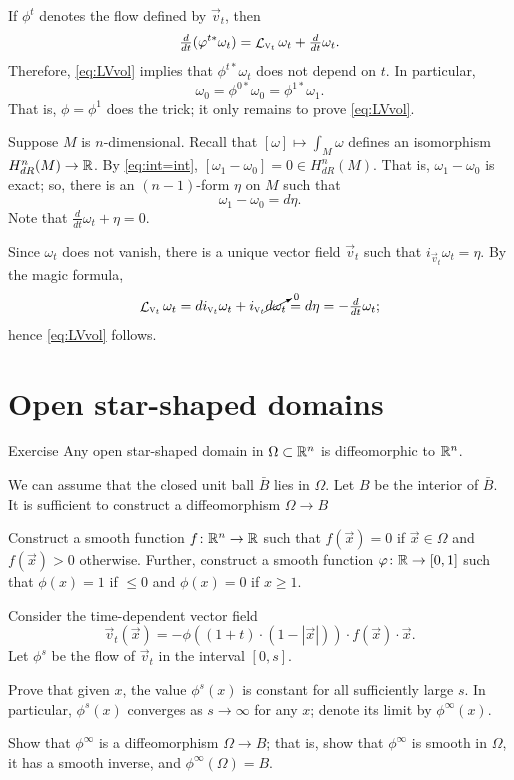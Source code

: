 If $\phi^t$ denotes the flow defined by $\vec v_t$, then
\[\tfrac d{dt}(\varphi^{t*}\omega_t)=\mathop{\mathcal{L}}\nolimits_{\text{\rm \textsc{v}}_t}\omega_t+\tfrac d{dt}\omega_t.\]
Therefore, \ref{eq:LVvol} implies that $\phi^{t*}\omega_t$ does not depend on $t$.
In particular,
\[\omega_0=\phi^{0*}\omega_0=\phi^{1*}\omega_1.\]
That is, $\phi=\phi^1$ does the trick; it only remains to prove \ref{eq:LVvol}.

Suppose $M$ is $n$-dimensional.
Recall that $[\omega]\mapsto\int_M\omega$ defines an isomorphism $H^n_{dR}(M)\to\mathbb{R}$.
By \ref{eq:int=int}, $[\omega_1-\omega_0]=0\in H^n_{dR}(M)$.
That is, $\omega_1-\omega_0$ is exact; so, there is an $(n-1)$-form $\eta$ on $M$ such that
\[\omega_1-\omega_0=d\eta.\]
Note that $\tfrac{d}{d t} \omega_t+\eta=0$.

Since $\omega_t$ does not vanish, there is a unique vector field $\vec{v}_t$ such that
$i_{\vec v_t}\omega_t=\eta$.
By the magic formula,
\[\mathop{\mathcal{L}}\nolimits_{\text{\rm \textsc{v}}_t}\omega_t=di_{\text{\rm \textsc{v}}_t}\omega_t+i_{\text{\rm \textsc{v}}_t}\cancelto{{}_0}{d\omega_t}=d\eta=-\tfrac{d}{d t} \omega_t;\]
hence \ref{eq:LVvol} follows.
\qeds

\section{Open star-shaped domains}

\begin{thm}{Exercise}
Any open star-shaped domain in $\Omega\subset\mathbb{R}^n$ is diffeomorphic to $\mathbb{R}^n$.
\end{thm}

We can assume that the closed unit ball $\bar B$ lies in $\Omega$.
Let $B$ be the interior of $\bar B$.
It is sufficient to construct a diffeomorphism $\Omega\to B$

Construct a smooth function $f\colon\mathbb{R}^n\to \mathbb{R}$ such that
$f(\vec x)=0$ if $\vec x\in \Omega$ and $f(\vec x)>0$ otherwise.
Further, construct a smooth function $\varphi\colon\mathbb{R}\to [0,1]$ such that $\phi(x)=1$ if $\le 0$ and $\phi(x)=0$ if $x\ge 1$.

Consider the time-dependent vector field
\[\vec v_t(\vec x)=-\phi((1+t)\cdot(1-|\vec x|))\cdot f(\vec x)\cdot \vec x.\]
Let $\phi^s$ be the flow of $\vec v_t$ in the interval $[0,s]$.

Prove that given $x$, the value $\phi^s(x)$ is constant for all sufficiently large $s$.
In particular, $\phi^s(x)$ converges as $s\to\infty$ for any $x$;
denote its limit by $\phi^\infty(x)$.

Show that $\phi^\infty$ is a diffeomorphism $\Omega\to B$;
that is, show that $\phi^\infty$ is smooth in $\Omega$, it has a smooth inverse, and $\phi^\infty(\Omega)=B$.
\qeds

